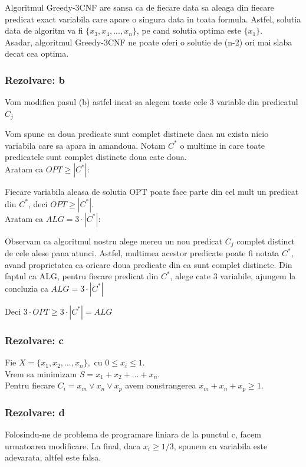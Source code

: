 \documentclass[a4paper]{article}
\begin{document}
\begin{flushleft}
Algoritmul Greedy-3CNF are sansa ca de fiecare data sa aleaga din fiecare predicat exact variabila care apare o singura data in toata formula. Astfel, solutia data de algoritm va fi $\{x_{3}, x_{4}, ..., x_{n}\}$, pe cand solutia optima este $\{x_{1}\}$. \\
Asadar, algoritmul Greedy-3CNF ne poate oferi o solutie de (n-2) ori mai slaba decat cea optima.

\subsubsection*{Rezolvare: b}
Vom modifica pasul (b) astfel incat sa alegem toate cele 3 variable din predicatul $C_{j}$

Vom spune ca doua predicate sunt complet distincte daca nu exista nicio variabila care sa apara in amandoua. Notam $C^{*}$ o multime in care toate predicatele sunt complet distincte doua cate doua.\\

Aratam ca $OPT \geq |C^{*}|$:

Fiecare variabila aleasa de solutia OPT poate face parte din cel mult un predicat din $C^{*}$, deci $OPT \geq |C^{*}|$.\\

Aratam ca $ALG = 3 \cdot |C^{*}|$:

Observam ca algoritmul nostru alege mereu un nou predicat $C_{j}$ complet distinct de cele alese pana atunci. Astfel, multimea acestor predicate poate fi notata  $C^{*}$, avand proprietatea ca oricare doua predicate din ea sunt complet distincte.
Din faptul ca ALG, pentru fiecare predicat din $C^{*}$, alege cate 3 variabile, ajungem la concluzia ca $ALG = 3 \cdot |C^{*}|$

Deci $3 \cdot OPT \geq 3 \cdot |C^{*}| = ALG$


\subsubsection*{Rezolvare: c}
Fie $X = \{x_{1}, x_{2}, ... ,x_{n}\},$ cu $0 \leq x_{i} \leq 1$.\\
Vrem sa minimizam $S = x_{1} + x_{2} + ... + x_{n}$.\\
Pentru fiecare $C_{i} = x_{m} \vee x_{n} \vee x_{p}$ avem constrangerea $x_{m} + x_{n} + x_{p} \geq 1$.

\subsubsection*{Rezolvare: d}
Folosindu-ne de problema de programare liniara de la punctul c, facem urmatoarea modificare. La final, daca $x_{i} \geq 1/3$, spunem ca variabila este adevarata, altfel este falsa.


\end{flushleft}
\end{document}
